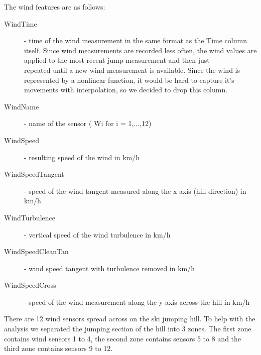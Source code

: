 \documentclass[sigconf,natbib=false, language=english]{acmart}
\begin{document}
The wind features are as follows:
\begin{description}
    \item [WindTime] - time of the wind measurement in the same format as the Time column itself. Since wind measurements
    are recorded less often, the wind values are applied to the most recent jump measurement and then just \\
    repeated until a new wind measurement is available. Since the wind is represented by a nonlinear function, it would be hard to capture
    it's movements with interpolation, so we decided to drop this column.
    \item [WindName] - name of the sensor ( Wi for i = 1,...,12)
    \item [WindSpeed] - resulting speed of the wind in km/h 
    \item [WindSpeedTangent] - speed of the wind tangent measured along the x axis (hill direction) in km/h
    \item [WindTurbulence] - vertical speed of the wind turbulence in km/h
    \item [WindSpeedCleanTan] - wind speed tangent with\linebreak
    turbulence removed in km/h
    \item [WindSpeedCross] - speed of the wind measurement along the y axis across the hill in km/h
\end{description}


There are 12 wind sensors spread across on the ski jumping hill. To help with
the analysis we separated the jumping section of the hill into 3 zones. The first zone
contains wind sensors 1 to 4, the second zone contains sensors 5 to 8 and the third zone
contains sensors 9 to 12.
\end{document}

